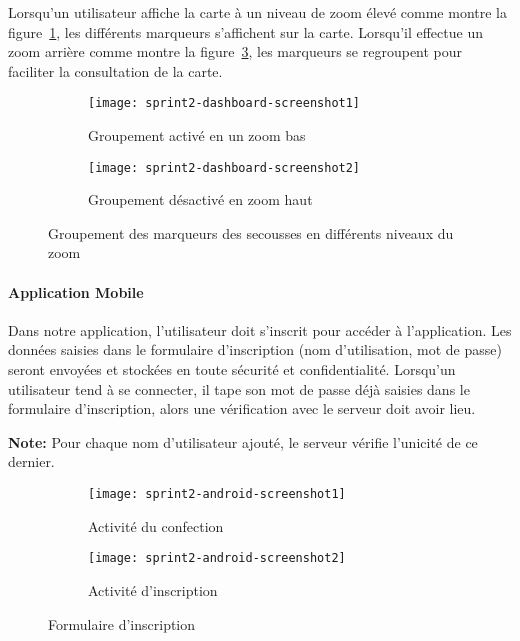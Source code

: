 Lorsqu'un utilisateur affiche la carte à un niveau de zoom élevé comme montre
la figure~\ref{fig:sprint2-dashboard-screenshot1}, les différents marqueurs
s'affichent sur la carte. Lorsqu'il effectue un zoom arrière comme montre la
figure~\ref{fig:sprint2-dashboard-screenshot2}, les marqueurs se regroupent
pour faciliter la consultation de la carte.

\begin{figure}[htbp]
    \begin{subfigure}{.5\textwidth}
        \centering
        \texttt{[image: sprint2-dashboard-screenshot1]}
        \caption{Groupement activé en un zoom bas}
        \label{fig:sprint2-dashboard-screenshot1}
    \end{subfigure}
    \begin{subfigure}{.5\textwidth}
        \centering
        \texttt{[image: sprint2-dashboard-screenshot2]}
        \caption{Groupement désactivé en zoom haut}
        \label{fig:sprint2-dashboard-screenshot2}
    \end{subfigure}
    \caption{Groupement des marqueurs des secousses en différents niveaux du zoom}
\end{figure}

\paragraph{Application Mobile }

Dans notre application, l'utilisateur doit s'inscrit pour accéder à
l'application. Les données saisies dans le formulaire d'inscription (nom
d'utilisation, mot de passe) seront envoyées et stockées en toute sécurité et
confidentialité. Lorsqu'un utilisateur tend à se connecter, il tape son mot de
passe déjà saisies dans le formulaire d'inscription, alors une vérification
avec le serveur doit avoir lieu.

\textbf{Note:} Pour chaque nom d'utilisateur ajouté, le serveur vérifie
l'unicité de ce dernier.

\begin{figure}[htbp]
\centering
    \begin{subfigure}{.45\textwidth}
        \centering
        \centering
        \texttt{[image: sprint2-android-screenshot1]}
        \caption{Activité du confection}
        \label{fig:sprint2-android-screenshot1}
    \end{subfigure}
    \begin{subfigure}{.45\textwidth}
        \centering
        \centering
        \texttt{[image: sprint2-android-screenshot2]}
        \caption{Activité d'inscription}
        \label{fig:sprint2-android-screenshot2}
    \end{subfigure}
    \caption{Formulaire d'inscription}
\end{figure}

